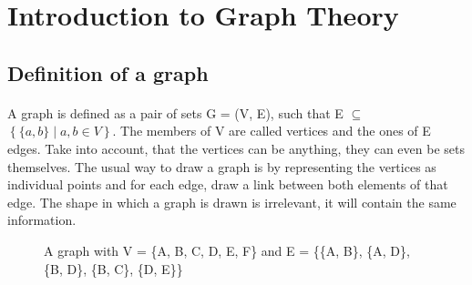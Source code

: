 \section{Introduction to Graph Theory}

\subsection{Definition of a graph}
\paragraph{}
A graph is defined as a pair of sets G = (V, E), such that E $\subseteq$ $\left\{\{a, b\} \mid a,b \in V\right\}$. The members of V are called vertices and the ones of E edges. Take into account, that the vertices can be anything, they can even be sets themselves. The usual way to draw a graph is by representing the vertices as individual points and for each edge, draw a link between both elements of that edge. The shape in which a graph is drawn is irrelevant, it will contain the same information.

\begin{figure}[h]

\caption{A graph with V = \{A, B, C, D, E, F\} and E = \{\{A, B\}, \{A, D\}, \{B, D\}, \{B, C\}, \{D, E\}\}}
\end{figure}

